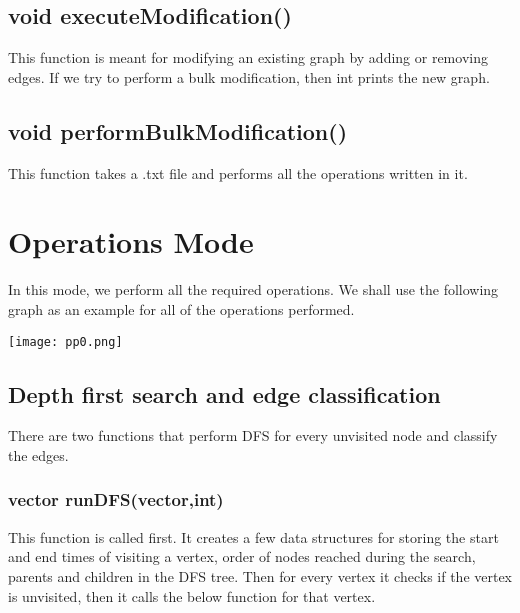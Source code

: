 \documentclass{article}
\begin{document}
\subsection{void executeModification()}
This function is meant for modifying an existing graph by adding or removing edges. If we try to perform a bulk modification, then int prints the new graph.
\subsection{void performBulkModification()}
This function takes a .txt file and performs all the operations written in it.


\section{Operations Mode}
In this mode, we perform all the required operations. We shall use the following graph as an example for all of the operations performed.
\begin{center}
\texttt{[image: pp0.png]}
\end{center}
\subsection{Depth first search and edge classification}
There are two functions that perform DFS for every unvisited node and classify the edges.
\subsubsection{vector runDFS(vector,int)}
\label{dfs}
This function is called first. It creates a few data structures for storing the start and end times of visiting a vertex, order of nodes reached during the search, parents and children in the DFS tree. Then for every vertex it checks if the vertex is unvisited, then it calls the below function for that vertex.
\end{document}
